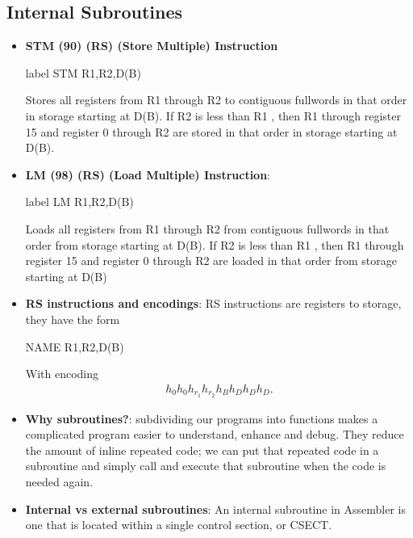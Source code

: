 \documentclass{report}
\begin{document}
    \subsection{Internal Subroutines}
    \begin{itemize}
        \item \textbf{STM (90) (RS) (Store Multiple) Instruction}
            \bigbreak \noindent 
            \begin{cppcode}
                label STM R1,R2,D(B)
            \end{cppcode}
            Stores all registers from R1 through R2 to contiguous fullwords in that order in storage starting at D(B).
            \bigbreak \noindent 
            If R2 is less than R1 , then R1 through register 15 and register 0 through R2 are stored in that order in storage starting at D(B).
        \item \textbf{LM (98) (RS) (Load Multiple) Instruction}:
            \bigbreak \noindent 
            \begin{cppcode}
            label LM R1,R2,D(B)
            \end{cppcode}
            \bigbreak \noindent 
            Loads all registers from R1 through R2 from contiguous fullwords in that order from storage starting at D(B).
            \bigbreak \noindent 
            If R2 is less than R1 , then R1 through register 15 and register 0 through R2 are loaded in that order from storage starting at D(B)
        \item \textbf{RS instructions and encodings}: RS instructions are registers to storage, they have the form
            \bigbreak \noindent 
            \begin{cppcode}
            NAME   R1,R2,D(B)
            \end{cppcode}
            \bigbreak \noindent 
            With encoding
            \bigbreak \noindent 
            \begin{align*}
                h_{0}h_{0}h_{r_{1}}h_{r_{2}}h_{B}h_{D}h_{D}h_{D}
            .\end{align*}
        \item \textbf{Why subroutines?}: subdividing our programs into functions makes a complicated program easier to understand, enhance and debug. They reduce the amount of inline repeated code; we can put that repeated code in a subroutine and simply call and execute that subroutine when the code is needed again.
        \item \textbf{Internal vs external subroutines}: An internal subroutine in Assembler is one that is located within a single control section, or CSECT.

\end{itemize}
\end{document}
